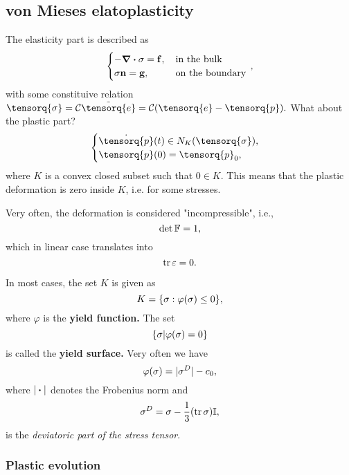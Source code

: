\documentclass[reqno, a4paper]{article}
\begin{document}
\subsection{von Mieses elatoplasticity}
\label{sec:von_mieses}

The elasticity part is described as
\[
	\begin{cases}
		- \divergence{\tensorq{\sigma}} = \vb{f}, &  \, \text{in the bulk} \,\\
		\tensorq{\sigma} \vb{n} = \vb{g}, & \, \text{on the boundary} \, \\
	\end{cases},
\]
with some constituive relation $\tensorq{\sigma} = \mathcal{C}\tilde{\tensorq{e}} = \mathcal{C}\qty(\tensorq{e}-\tensorq{p}).$
What about the plastic part? 
\[
	\begin{cases} 
		\dot{\tensorq{p}}(t) \in N_K\qty(\tensorq{\sigma}), & \\
		\tensorq{p}(0)=\tensorq{p}_0, &
	\end{cases}
\]
where $K$ is a convex closed subset such that $0 \in K$. This means that the plastic deformation is zero inside $K$, i.e. for some stresses. 

\begin{remark}
    Very often, the deformation is considered "incompressible", i.e.,
    \[
	    \det \mathbb{F} = 1,
    \]
    which in linear case translates into
    \[
	    \tr \mathbb{\varepsilon} = 0.
    \]
\end{remark}

In most cases, the set $K$ is given as
\[
	K = \{ \mathbb{\sigma}:\varphi\qty(\mathbb{\sigma}) \leq 0\},
\]
where $\varphi$ is the \textbf{yield function.} The set
\[
	\{\mathbb{\sigma}| \varphi\qty(\mathbb{\sigma}) = 0\}
\]
is called the \textbf{yield surface.} Very often we have
\[
	\varphi\qty(\mathbb{\sigma}) = |\mathbb{\sigma}^D|-c_0,
\]
where $| \vdot |$ denotes the Frobenius norm and
\[
	\mathbb{\sigma}^D = \mathbb{\sigma} - \frac{1}{3}\qty(\tr \mathbb{\sigma})\mathbb{I},
\]
is the \textit{deviatoric part of the stress tensor}.

\subsubsection{Plastic evolution}
\label{sec:plastic_evolution}
\end{document}
